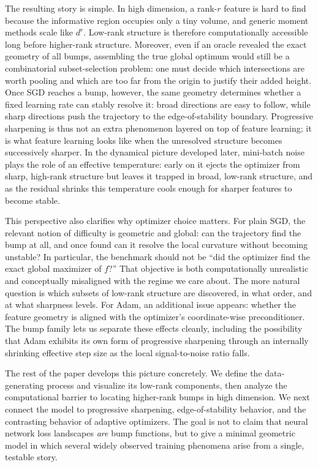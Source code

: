 \documentclass{article}
\begin{document}
The resulting story is simple. In high dimension, a rank-$r$ feature is
hard to find because the informative region occupies only a tiny volume,
and generic moment methods scale like $d^r$. Low-rank structure is
therefore computationally accessible long before higher-rank structure.
Moreover, even if an oracle revealed the exact geometry of all bumps,
assembling the true global optimum would still be a combinatorial
subset-selection problem: one must decide which intersections are worth
pooling and which are too far from the origin to justify their added
height. Once SGD reaches a bump, however, the same geometry determines whether a
fixed learning rate can stably resolve it: broad directions are easy to
follow, while sharp directions push the trajectory to the
edge-of-stability boundary. Progressive sharpening is thus not an extra
phenomenon layered on top of feature learning; it is what feature
learning looks like when the unresolved structure becomes successively
sharper. In the dynamical picture developed later, mini-batch noise
plays the role of an effective temperature: early on it ejects the
optimizer from sharp, high-rank structure but leaves it trapped in
broad, low-rank structure, and as the residual shrinks this temperature
cools enough for sharper features to become stable.

This perspective also clarifies why optimizer choice matters. For plain
SGD, the relevant notion of difficulty is geometric and global: can the
trajectory find the bump at all, and once found can it resolve the local
curvature without becoming unstable? In particular, the benchmark should
not be ``did the optimizer find the exact global maximizer of $f$?''
That objective is both computationally unrealistic and conceptually
misaligned with the regime we care about. The more natural question is
which subsets of low-rank structure are discovered, in what order, and
at what sharpness levels. For Adam, an additional issue
appears: whether the feature geometry is aligned with the optimizer's
coordinate-wise preconditioner. The bump family lets us separate these
effects cleanly, including the possibility that Adam exhibits its own
form of progressive sharpening through an internally shrinking effective
step size as the local signal-to-noise ratio falls.

The rest of the paper develops this picture concretely. We define the
data-generating process and visualize its low-rank components, then
analyze the computational barrier to locating higher-rank bumps in high
dimension. We next connect the model to progressive sharpening,
edge-of-stability behavior, and the contrasting behavior of adaptive
optimizers. The goal is not to claim that neural network loss landscapes
\emph{are} bump functions, but to give a minimal geometric model in
which several widely observed training phenomena arise from a single,
testable story.
\end{document}
